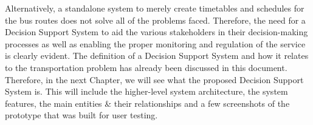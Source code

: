 Alternatively, a standalone system to merely create timetables and schedules for the bus routes does not solve all of the problems faced. Therefore, the need for a Decision Support System to aid the various stakeholders in their decision-making processes as well as enabling the proper monitoring and regulation of the service is clearly evident. The definition of a Decision Support System and how it relates to the transportation problem has already been discussed in this document. Therefore, in the next Chapter, we will see what the proposed Decision Support System is. This will include the higher-level system architecture, the system features, the main entities \& their relationships and a few screenshots of the prototype that was built for user testing.